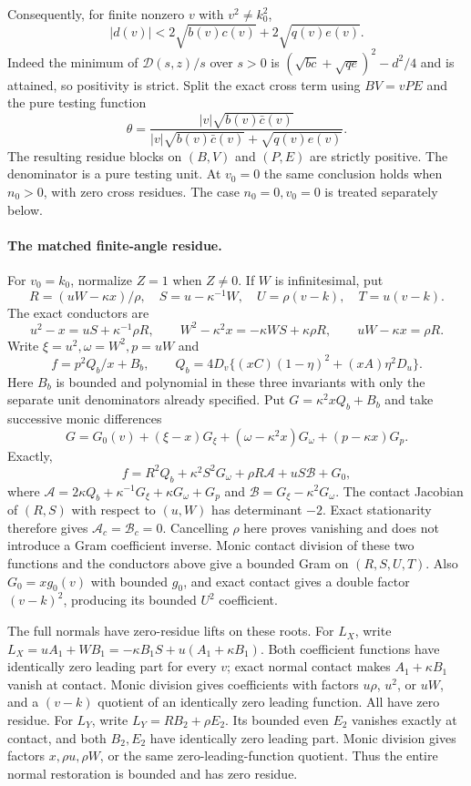 Consequently, for finite nonzero $v$ with $v^2\ne k_0^2$,
\[
 |d(v)|<2\sqrt{b(v)c(v)}+2\sqrt{q(v)e(v)}.
\]
Indeed the minimum of $\mathcal D(s,z)/s$ over $s>0$ is
$(\sqrt{bc}+\sqrt{qe})^2-d^2/4$ and is attained, so positivity is
strict.  Split the exact cross term using $BV=vPE$ and the pure
testing function
\[
 \theta=\frac{|v|\sqrt{b(v)\bar c(v)}}
 {|v|\sqrt{b(v)\bar c(v)}+\sqrt{q(v)e(v)}}.
\]
The resulting residue blocks on $(B,V)$ and $(P,E)$ are strictly
positive.  The denominator is a pure testing unit.  At $v_0=0$ the
same conclusion holds when $n_0>0$, with zero cross residues.
The case $n_0=0,v_0=0$ is treated separately below.

\paragraph{The matched finite-angle residue.}
For $v_0=k_0$, normalize $Z=1$ when $Z\ne0$.  If $W$ is
infinitesimal, put
\[
 R=(uW-\kappa x)/\rho,\quad S=u-\kappa^{-1}W,
 \quad U=\rho(v-k),\quad T=u(v-k).
\]
The exact conductors are
\[
 u^2-x=uS+\kappa^{-1}\rho R,\qquad
 W^2-\kappa^2x=-\kappa WS+\kappa\rho R,
 \qquad uW-\kappa x=\rho R.
\]
Write $\xi=u^2,\omega=W^2,p=uW$ and
\[
 f=p^2Q_b/x+B_b,\qquad
 Q_b=4D_v\{(xC)(1-\eta)^2+(xA)\eta^2D_u\}.
\]
Here $B_b$ is bounded and polynomial in these three invariants with
only the separate unit denominators already specified.  Put
$G=\kappa^2xQ_b+B_b$ and take successive monic differences
\[
 G=G_0(v)+(\xi-x)G_\xi+(\omega-\kappa^2x)G_\omega
                    +(p-\kappa x)G_p.
\]
Exactly,
\[
 f=R^2Q_b+\kappa^2S^2G_\omega+\rho R\mathcal A+uS\mathcal B+G_0,
\]
where $\mathcal A=2\kappa Q_b+\kappa^{-1}G_\xi+
\kappa G_\omega+G_p$ and $\mathcal B=G_\xi-\kappa^2G_\omega$.
The contact Jacobian of $(R,S)$ with respect to $(u,W)$ has
determinant $-2$.  Exact stationarity therefore gives
$\mathcal A_c=\mathcal B_c=0$.  Cancelling $\rho$ here proves
vanishing and does not introduce a Gram coefficient inverse.
Monic contact division of these two functions and the conductors
above give a bounded Gram on $(R,S,U,T)$.
Also $G_0=xg_0(v)$ with bounded $g_0$, and exact contact gives a
double factor $(v-k)^2$, producing its bounded $U^2$ coefficient.

The full normals have zero-residue lifts on these roots.  For $L_X$,
write $L_X=uA_1+WB_1=-\kappa B_1S+u(A_1+\kappa B_1)$.
Both coefficient functions have identically zero leading part for
every $v$; exact normal contact makes $A_1+\kappa B_1$ vanish at
contact.  Monic division gives coefficients with factors $u\rho$,
$u^2$, or $uW$, and a $(v-k)$ quotient of an identically zero
leading function.  All have zero residue.  For $L_Y$, write
$L_Y=RB_2+\rho E_2$.  Its bounded even $E_2$ vanishes exactly at
contact, and both $B_2,E_2$ have identically zero leading part.
Monic division gives factors $x,\rho u,\rho W$, or the same
zero-leading-function quotient.  Thus the entire normal restoration
is bounded and has zero residue.

